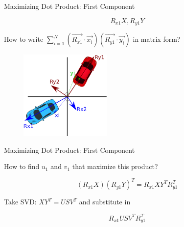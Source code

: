 \documentclass{beamer}
\begin{document}
\begin{frame}{Maximizing Dot Product: First Component}

\[R_{x1} X, R_{y1} Y \]

How to write $\sum_{i=1}^N  (\vec{R_{x1}} \cdot \vec{x_i})(\vec{R_{y1}} \cdot \vec{y_i})$ in matrix form?


\begin{figure}[t]
	\centering
    \includegraphics[width=0.4\textwidth]{CarRotAxesPointProj.pdf}
\end{figure}


\end{frame}


\begin{frame}{Maximizing Dot Product: First Component}

How to find $u_1$ and $v_1$ that maximize this product?

\[  (R_{x1} X) (R_{y1} Y)^T = R_{x1} X Y^T R_{y1}^T \]

Take SVD: $XY^T = USV^T$ and substitute in

\[ R_{x1} U S V^T R_{y1}^T \]


\end{frame}
\end{document}
